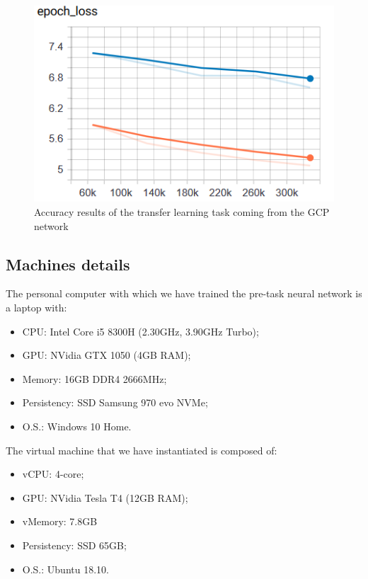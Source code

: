 \begin{figure}[!ht]
    \centering
    \includegraphics[scale=0.60]{images/TL_GCP_loss.png}
    \caption{Accuracy results of the transfer learning task coming from the GCP network}
    \label{fig:TL_GCP_loss}
\end{figure}


\subsection{Machines details}\label{ss:machines}
The personal computer with which we have trained the pre-task neural network is a laptop with:
\begin{itemize}
    \item CPU: Intel Core i5 8300H (2.30GHz, 3.90GHz Turbo);
    \item GPU: NVidia GTX 1050 (4GB RAM);
    \item Memory: 16GB DDR4 2666MHz;
    \item Persistency: SSD Samsung 970 evo NVMe;
    \item O.S.: Windows 10 Home.
\end{itemize}
The virtual machine that we have instantiated is composed of:
\begin{itemize}
    \item vCPU: 4-core;
    \item GPU: NVidia Tesla T4 (12GB RAM);
    \item vMemory: 7.8GB
    \item Persistency: SSD 65GB;
    \item O.S.: Ubuntu 18.10.
\end{itemize}



